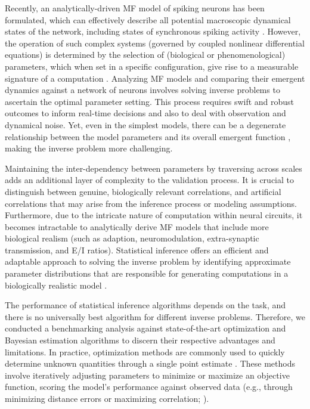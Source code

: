 \documentclass[12pt]{article}
\begin{document}
Recently, an analytically-driven MF model of spiking neurons has been formulated, which can effectively describe all potential macroscopic dynamical states of the network, including states of synchronous spiking activity \citep{Montbrio_Pazo_Roxin}. However, the operation of such complex systems (governed by coupled nonlinear differential equations) is determined by the selection of (biological or phenomenological) parameters, which when set in a specific configuration, give rise to a measurable signature of a computation \citep{Achard2006, Sussillo2014}. Analyzing MF models and comparing their emergent dynamics against a network of neurons involves solving inverse problems to ascertain the optimal parameter setting. This process requires swift and robust outcomes to inform real-time decisions and also to deal with observation and dynamical noise. Yet, even in the simplest models, there can be a degenerate relationship between the model parameters and its overall emergent function \citep{Edelman2001, Prinz2004, Alonso2019}, making the inverse problem more challenging. 

Maintaining the inter-dependency between parameters by traversing across scales adds an additional layer of complexity to the validation process. It is crucial to distinguish between genuine, biologically relevant correlations, and artificial correlations that may arise from the inference process or modeling assumptions. Furthermore, due to the intricate nature of computation within neural circuits, it becomes intractable to analytically derive MF models that include more biological realism (such as adaption, neuromodulation, extra-synaptic transmission, and  E/I ratios). Statistical inference offers an efficient and adaptable approach to solving the inverse problem by identifying approximate parameter distributions that are responsible for generating computations in a biologically realistic model \citep{Achard2006, Liepe2014, Lueckmann2017, Goncalves2020, Bittner2021, Mlynarski2021}. 


The performance of statistical inference algorithms depends on the task, and there is no universally best algorithm for different inverse problems. Therefore, we conducted a benchmarking analysis against state-of-the-art optimization and Bayesian estimation algorithms to discern their respective advantages and limitations.
In practice, optimization methods are commonly used to quickly determine unknown quantities through a single point estimate \citep{Mendes1998, Nocedal1999, Kelley1999, Floudas2009}. These methods involve iteratively adjusting parameters to minimize or maximize an objective function, scoring the model's performance against observed data (e.g., through minimizing distance errors or maximizing correlation; \cite{Banga2008, Tashkova2011, Svensson2012, Hashemi2018}). 
\end{document}
